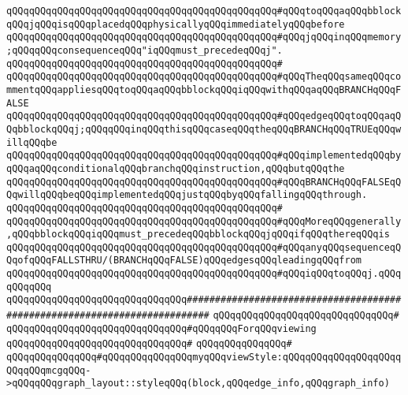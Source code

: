 \verb|qQQqqQQqqQQqqQQqqQQqqQQqqQQqqQQqqQQqqQQqqQQqqQQq#qQQqtoqQQqaqQQqbblockqQQqjqQQqisqQQqplacedqQQqphysicallyqQQqimmediatelyqQQqbefore|\newline
\verb|qQQqqQQqqQQqqQQqqQQqqQQqqQQqqQQqqQQqqQQqqQQqqQQq#qQQqjqQQqinqQQqmemory;qQQqqQQqconsequenceqQQq"iqQQqmust_precedeqQQqj".|\newline
\verb|qQQqqQQqqQQqqQQqqQQqqQQqqQQqqQQqqQQqqQQqqQQqqQQq#|\newline
\verb|qQQqqQQqqQQqqQQqqQQqqQQqqQQqqQQqqQQqqQQqqQQqqQQq#qQQqTheqQQqsameqQQqcommentqQQqappliesqQQqtoqQQqaqQQqbblockqQQqiqQQqwithqQQqaqQQqBRANCHqQQqFALSE|\newline
\verb|qQQqqQQqqQQqqQQqqQQqqQQqqQQqqQQqqQQqqQQqqQQqqQQq#qQQqedgeqQQqtoqQQqaqQQqbblockqQQqj;qQQqqQQqinqQQqthisqQQqcaseqQQqtheqQQqBRANCHqQQqTRUEqQQqwillqQQqbe|\newline
\verb|qQQqqQQqqQQqqQQqqQQqqQQqqQQqqQQqqQQqqQQqqQQqqQQq#qQQqimplementedqQQqbyqQQqaqQQqconditionalqQQqbranchqQQqinstruction,qQQqbutqQQqthe|\newline
\verb|qQQqqQQqqQQqqQQqqQQqqQQqqQQqqQQqqQQqqQQqqQQqqQQq#qQQqBRANCHqQQqFALSEqQQqwillqQQqbeqQQqimplementedqQQqjustqQQqbyqQQqfallingqQQqthrough.|\newline
\verb|qQQqqQQqqQQqqQQqqQQqqQQqqQQqqQQqqQQqqQQqqQQqqQQq#|\newline
\verb|qQQqqQQqqQQqqQQqqQQqqQQqqQQqqQQqqQQqqQQqqQQqqQQq#qQQqMoreqQQqgenerally,qQQqbblockqQQqiqQQqmust_precedeqQQqbblockqQQqjqQQqifqQQqthereqQQqis|\newline
\verb|qQQqqQQqqQQqqQQqqQQqqQQqqQQqqQQqqQQqqQQqqQQqqQQq#qQQqanyqQQqsequenceqQQqofqQQqFALLSTHRU/(BRANCHqQQqFALSE)qQQqedgesqQQqleadingqQQqfrom|\newline
\verb|qQQqqQQqqQQqqQQqqQQqqQQqqQQqqQQqqQQqqQQqqQQqqQQq#qQQqiqQQqtoqQQqj.qQQqqQQqqQQq|\newline
\newline
\newline
\newline
\verb|qQQqqQQqqQQqqQQqqQQqqQQqqQQqqQQq##########################################################################|\newline
\verb|qQQqqQQqqQQqqQQqqQQqqQQqqQQqqQQq#|\newline
\verb|qQQqqQQqqQQqqQQqqQQqqQQqqQQqqQQq#qQQqqQQqForqQQqviewing|\newline
\verb|qQQqqQQqqQQqqQQqqQQqqQQqqQQqqQQq#|\newline
\verb|qQQqqQQqqQQqqQQq#|\newline
\verb|qQQqqQQqqQQqqQQq#qQQqqQQqqQQqqQQqmyqQQqviewStyle:qQQqqQQqqQQqqQQqqQQqqQQqqQQqmcgqQQq->qQQqqQQqgraph_layout::styleqQQq(block,qQQqedge_info,qQQqgraph_info)|\newline
